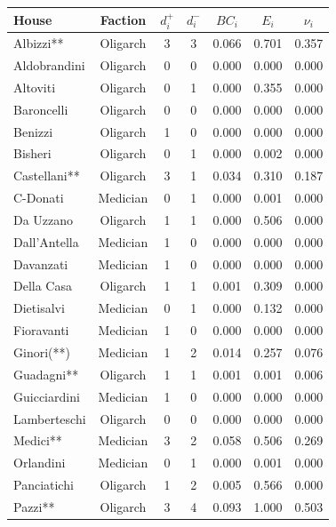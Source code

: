 \documentclass[11pt,fleqn]{article}
\begin{document}
\begin{table}[h]
\begin{center}
\begin{tabular}{|l|c|ccccc|}
\toprule
House & Faction & $d^+_i$ & $d^-_i$ & $BC_i$	&  $E_i$	&  $\nu_i$	\\
\midrule
Albizzi**       & Oligarch	& 3 & 3 & 0.066 & 0.701 & 0.357      \\
Aldobrandini    & Oligarch	& 0 & 0 & 0.000 & 0.000 & 0.000      \\
Altoviti        & Oligarch	& 0 & 1 & 0.000 & 0.355 & 0.000      \\
Baroncelli      & Oligarch	& 0 & 0 & 0.000 & 0.000 & 0.000      \\
Benizzi         & Oligarch	& 1 & 0 & 0.000 & 0.000 & 0.000      \\
Bisheri         & Oligarch	& 0 & 1 & 0.000 & 0.002 & 0.000      \\
Castellani**    & Oligarch	& 3 & 1 & 0.034 & 0.310 & 0.187      \\
C-Donati        & Medician	& 0 & 1 & 0.000 & 0.001 & 0.000      \\
Da Uzzano       & Oligarch	& 1 & 1 & 0.000 & 0.506 & 0.000      \\
Dall'Antella    & Medician	& 1 & 0 & 0.000 & 0.000 & 0.000      \\
Davanzati       & Medician	& 1 & 0 & 0.000 & 0.000 & 0.000      \\
Della Casa      & Oligarch	& 1 & 1 & 0.001 & 0.309 & 0.000      \\
Dietisalvi      & Medician	& 0 & 1 & 0.000 & 0.132 & 0.000      \\
Fioravanti      & Medician	& 1 & 0 & 0.000 & 0.000 & 0.000      \\
Ginori(**)      & Medician	& 1 & 2 & 0.014 & 0.257 & 0.076      \\
Guadagni**      & Oligarch	& 1 & 1 & 0.001 & 0.001 & 0.006      \\
Guicciardini    & Medician	& 1 & 0 & 0.000 & 0.000 & 0.000      \\
Lamberteschi    & Oligarch	& 0 & 0 & 0.000 & 0.000 & 0.000      \\
Medici**        & Medician	& 3 & 2 & 0.058 & 0.506 & 0.269      \\
Orlandini       & Medician	& 0 & 1 & 0.000 & 0.001 & 0.000      \\
Panciatichi     & Oligarch	& 1 & 2 & 0.005 & 0.566 & 0.000      \\
Pazzi**         & Oligarch    & 3 & 4 & 0.093 & 1.000 & 0.503      \\

\end{tabular}
\end{center}
\end{table}
\end{document}
